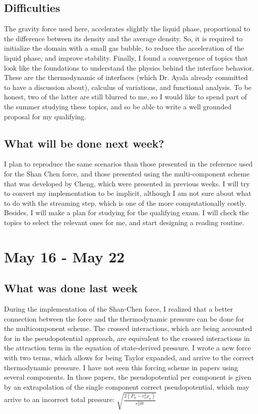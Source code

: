 \documentclass[12pt]{article}
\begin{document}
	\subsection*{Difficulties}
	The gravity force used here, accelerates slightly the liquid phase, proportional to the difference between its density and the average density. So, it is required to initialize the domain with a small gas bubble, to reduce the acceleration of the liquid phase, and improve stability. Finally, I found a convergence of topics that look like the foundations to understand the physics behind the interface behavior. These are the thermodynamic of interfaces (which Dr. Ayala already committed to have a discussion about), calculus of variations, and functional analysis. To be honest, two of the latter are still blurred to me, so I would like to spend part of the summer studying these topics, and so be able to write a well grounded proposal for my qualifying.
	
	\subsection*{What will be done next week?}
	I plan to reproduce the same scenarios than those presented in the reference used for the Shan Chen force, and those presented using the multi-component scheme that was developed by Cheng, which were presented in previous weeks. I will try to convert my implementation to be implicit, although I am not sure about what to do with the streaming step, which is one of the more computationally costly. Besides, I will make a plan for studying for the qualifying exam. I will check the topics to select the relevant ones for me, and start designing a reading routine. 
	
	\pagebreak
	\section*{May 16 - May 22}
	\subsection*{What was done last week}
	During the implementation of the Shan-Chen force, I realized that a better connection between the force and the thermodynamic pressure can be done for the multicomponent scheme. The crossed interactions, which are being accounted for in the pseudopotential approach, are equivalent to the crossed interactions in the attraction term in the equation of state-derived pressure. I wrote a new force with two terms, which allows for being Taylor expanded, and arrive to the correct thermodynamic pressure. I have not seen this forcing scheme in papers using several components. In those papers, the pseudopotential per component is given by an extrapolation of the single component correct pseudopotential, which may arrive to an incorrect total pressure:
	$\sqrt{\frac{2(P_\sigma - c_s^2 \rho_\sigma)}{c_s^2 \delta t }}$
	
\end{document}
